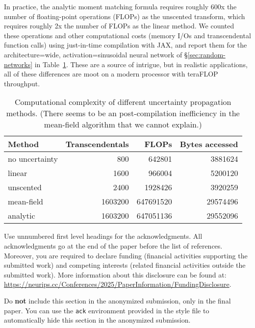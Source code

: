 \documentclass{article}
\begin{document}
In practice, the analytic moment matching formula requires roughly 600x the number of floating-point operations (FLOPs) as the unscented transform, which requires roughly 2x the number of FLOPs as the linear method.
We counted these operations and other computational costs (memory I/Os and transcendental function calls) using just-in-time compilation with JAX, and report them
for the architecture=wide, activation=sinusoidal neural network of \S\ref{sec:random-networks} in Table~\ref{tab:complexity}.
These are a source of intrigue, but in realistic applications, all of these differences are moot on a modern processor with teraFLOP throughput.

\begin{table}
\begin{center}
  \begin{tabular}{lrrr}
  \toprule
  Method & Transcendentals & FLOPs & Bytes accessed\\
  \midrule
  no uncertainty & 800 & 642801 & 3881624
  \\
  \midrule
  linear & 1600 & 966004 & 5200120 \\
  unscented & 2400 & 1928426 & 3920259 \\
  mean-field & 1603200 & 647691520 & 29574496 \\
  analytic & 1603200   & 647051136 & 29552096 \\
  \bottomrule
  \end{tabular}
\end{center}
\caption{\label{tab:complexity} Computational complexity of different uncertainty propagation methods. (There seems to be an post-compilation inefficiency in the mean-field algorithm that we cannot explain.)}
\end{table}


\begin{ack}
Use unnumbered first level headings for the acknowledgments. All acknowledgments
go at the end of the paper before the list of references. Moreover, you are required to declare
funding (financial activities supporting the submitted work) and competing interests (related financial activities outside the submitted work).
More information about this disclosure can be found at: \url{https://neurips.cc/Conferences/2025/PaperInformation/FundingDisclosure}.


Do {\bf not} include this section in the anonymized submission, only in the final paper. You can use the \texttt{ack} environment provided in the style file to automatically hide this section in the anonymized submission.
\end{ack}
\end{document}
